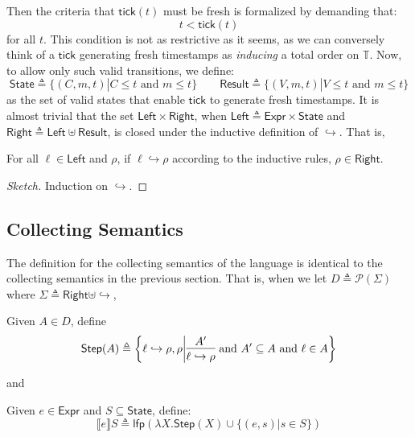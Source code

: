 \documentclass[acmsmall,screen,review]{acmart}\settopmatter{printfolios=true,printccs=false,printacmref=false}
\newcommand*{\pset}{\mathcal{P}}
\newcommand*{\Expr}{\mathsf{Expr}}
\newcommand*{\Time}{\mathbb{T}}
\newcommand*{\Left}{\mathsf{Left}}
\newcommand*{\Right}{\mathsf{Right}}
\newcommand*{\mem}{m}
\newcommand*{\State}{\mathsf{State}}
\newcommand*{\Result}{\mathsf{Result}}
\newcommand*{\lfp}{\mathsf{lfp}}
\newcommand*{\semarrow}{\hookrightarrow}
\newcommand*{\sembracket}[1]{\lBrack{#1}\rBrack}
\newcommand*{\tick}{\mathsf{tick}}
\begin{document}
Then the criteria that $\tick(t)$ must be fresh is formalized by demanding that:
\[t < \tick(t)\]
for all $t$.
This condition is not as restrictive as it seems, as we can conversely think of a $\tick$ generating fresh timestamps as \emph{inducing} a total order on $\Time$.
Now, to allow only such valid transitions, we define:
\[
  \State\triangleq\{(C,\mem,t)|C\le t\text{ and }\mem\le t\}\qquad
  \Result\triangleq\{(V,\mem,t)|V\le t\text{ and }\mem\le t\}
\]
as the set of valid states that enable $\tick$ to generate fresh timestamps.
It is almost trivial that the set $\Left\times\Right$, when $\Left\triangleq\Expr\times\State$ and $\Right\triangleq\Left\uplus\Result$, is closed under the inductive definition of $\semarrow$.
That is,
\begin{lemma}
  For all $\ell\in\Left$ and $\rho$, if $\ell\semarrow\rho$ according to the inductive rules, $\rho\in\Right$.
\end{lemma}
\begin{proof}[Sketch]
  Induction on $\semarrow$.
\end{proof}

\subsection{Collecting Semantics}
The definition for the collecting semantics of the language is identical to the collecting semantics in the previous section.
That is, when we let $D\triangleq\pset(\Sigma)$ where $\Sigma\triangleq\Right\uplus\semarrow$,
\begin{definition}
  Given $A\in D$, define
  \[
    \mathsf{Step}(A)\triangleq
    \left\{\ell\semarrow\rho, \rho\middle|
    \begin{prooftree}[center=true]
      \hypo{A'}\infer1{\ell\semarrow\rho}
    \end{prooftree}\text{ and }
    A'\subseteq A\text{ and }\ell\in A
    \right\}
  \]
\end{definition}
and
\begin{definition}
  Given $e\in\Expr$ and $S\subseteq\State$, define:
  \[
    \sembracket{e}S\triangleq\lfp(\lambda X.\mathsf{Step}(X)\cup\{(e,s)|s\in S\})
  \]
\end{definition}
\end{document}

